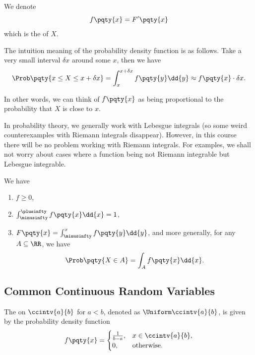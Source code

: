 \begin{definition}
    \label{def:probability-density-function}%
    We denote
    \[
        f\pqty{x} = F'\pqty{x}
    \]
    which is the  of \(X\).
\end{definition}

The intuition meaning of the probability density function is as follows. Take a very small interval \(\delta x\) around some \(x\), then we have
\[
    \Prob\pqty{x \leq X \leq x + \delta x} = \int_{x}^{x + \delta x} f\pqty{y} \dd{y} \approx f\pqty{x} \cdot \delta x.
\]

In other words, we can think of \(f\pqty{x}\) as being proportional to the probability that \(X\) is close to \(x\).

\begin{remark}
    In probability theory, we generally work with Lebesgue integrals (so some weird counterexamples with Riemann integrals disappear). However,  in this course there will be no problem working with Riemann integrals. For examples, we shall not worry about cases where a function being not Riemann integrable but Lebesgue integrable.
\end{remark}

\begin{proposition}
    \label{prop:properties-probability-density-function}%
    We have
    \begin{enumerate}
        \item \(f \geq 0\),
        \item \(\int_{\minusinfty}^{\plusinfty} f\pqty{x} \dd{x} = 1\),
        \item \(F\pqty{x} = \int_{\minusinfty}^{x} f\pqty{y} \dd{y}\), and more generally, for any \(A \subseteq \RR\), we have
        \[
            \Prob\pqty{X \in A} = \int_{A} f\pqty{x} \dd{x}.
        \]
    \end{enumerate}
\end{proposition}

\subsection{Common Continuous Random Variables}

\begin{definition}
    \label{def:uniform-distribution}%
    The  on \(\ccintv{a}{b}\) for \(a < b\), denoted as \(\Uniform\ccintv{a}{b}\), is given by the probability density function
    \[
        f\pqty{x} = \begin{cases}
            \frac{1}{b - a}, & x \in \ccintv{a}{b}, \\
            0, & \text{otherwise}.
        \end{cases}
    \]
\end{definition}


